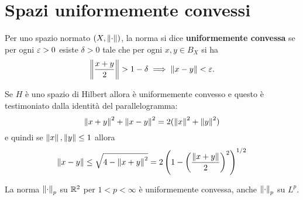\section{Spazi uniformemente convessi}
\begin{definition}
Per uno spazio normato $(X,{\left\Vert{\cdot}\right\Vert})$, la norma si dice \textbf{uniformemente convessa} se per ogni $\varepsilon>0$ esiste $\delta>0$ tale che per ogni $x,y\in B_X$ si ha
\[\left\Vert{\frac{x+y}2}\right\Vert>1-\delta\implies \left\Vert{x-y}\right\Vert<\varepsilon.\]
\end{definition}
\begin{example}
Se $H$ \`e uno spazio di Hilbert allora \`e uniformemente convesso e questo \`e testimoniato dalla identit\`a del parallelogramma: 
\[\left\Vert{x+y}\right\Vert^2+\left\Vert{x-y}\right\Vert^2=2(\left\Vert{x}\right\Vert^2+\left\Vert{y}\right\Vert^2)\]
e quindi se $\left\Vert{x}\right\Vert,\left\Vert{y}\right\Vert\leq 1$ allora
\[\left\Vert{x-y}\right\Vert\leq\sqrt{4-\left\Vert{x+y}\right\Vert^2}= 2\left({1-\left({\frac{\left\Vert{x+y}\right\Vert}2}\right)^2}\right)^{1/2}\]
\end{example}

\begin{example}
La norma ${\left\Vert{\cdot}\right\Vert}_p$ su $\mathbb{R}^2$ per $1<p<\infty$ \`e uniformemente convessa, anche ${\left\Vert{\cdot}\right\Vert}_p$ su $L^p$.
\end{example}

